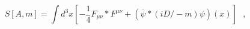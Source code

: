 \begin{equation} 
S[A,m] = \int d^{3}x[ -\frac {1}{4} F_{\mu \nu}* F^{\mu
\nu} + (\overline \psi *(i D\!\!\!\!/ - m)\psi)(x) ] ~~~, 
\end{equation}


